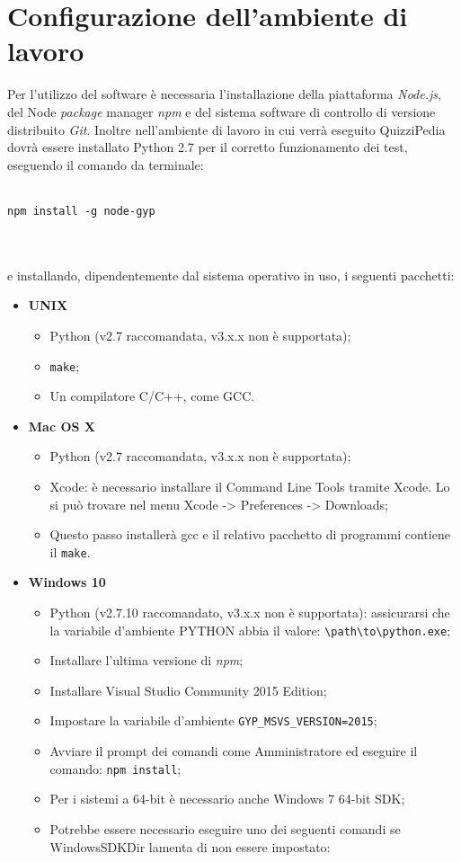 \newpage
\section{Configurazione dell'ambiente di lavoro}
Per l'utilizzo del software è necessaria l'installazione della piattaforma \textit{Node.js}, del Node \textit{package} manager \textit{npm} e del sistema software di controllo di versione distribuito \textit{Git}. 
Inoltre nell'ambiente di lavoro in cui verrà eseguito QuizziPedia dovrà essere installato Python 2.7 per il corretto funzionamento dei test, eseguendo il comando da terminale:\\
\\
\centerline{\texttt{npm install -g node-gyp}}\\
\\
e installando, dipendentemente dal sistema operativo in uso, i seguenti pacchetti:
\begin{itemize}
	\item \textbf{UNIX}
	\begin{itemize}
		\item Python (v2.7 raccomandata, v3.x.x non è supportata);
		\item \texttt{make};
		\item Un compilatore C/C++, come GCC.
	\end{itemize}
	\item \textbf{Mac OS X}
	\begin{itemize}
		\item Python (v2.7 raccomandata, v3.x.x non è supportata);
		\item Xcode: è necessario installare il Command Line Tools tramite Xcode. Lo si può trovare nel menu Xcode -> Preferences -> Downloads;
		\item Questo passo installerà gcc e il relativo pacchetto di programmi contiene il \texttt{make}.
	\end{itemize}
	\item \textbf{Windows 10}
	\begin{itemize}
		\item Python (v2.7.10 raccomandato, v3.x.x non è supportata): assicurarsi che la variabile d'ambiente PYTHON abbia il valore: \verb|\path\to\python.exe|;
		\item Installare l'ultima versione di \textit{npm};
		\item Installare Visual Studio Community 2015 Edition;
		\item Impostare la variabile d'ambiente \verb|GYP_MSVS_VERSION=2015|;
		\item Avviare il prompt dei comandi come Amministratore ed eseguire il comando: \texttt{npm install};
		\item Per i sistemi a 64-bit è necessario anche Windows 7 64-bit SDK;
		\item Potrebbe essere necessario eseguire uno dei seguenti comandi se WindowsSDKDir lamenta di non essere impostato:
	\end{itemize}
\end{itemize}
